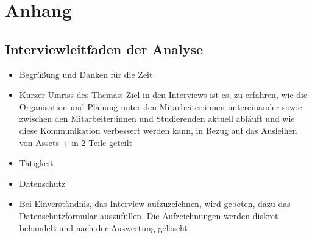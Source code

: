 \renewcommand{\thesection}{\Alph{section}}
\chapter{Anhang}

\section{Interviewleitfaden der Analyse}
\label{appendix:interview}

\begin{itemize}
    \item Begrüßung und Danken für die Zeit
    \item Kurzer Umriss des Themas: Ziel in den Interviews ist es, zu erfahren, wie die Organisation
          und Planung unter den Mitarbeiter:innen untereinander sowie zwischen den Mitarbeiter:innen und
          Studierenden aktuell abläuft und wie diese Kommunikation verbessert werden kann, in Bezug auf
          das Ausleihen von Assets + in 2 Teile geteilt
    \item Tätigkeit
    \item Datenschutz
    \item Bei Einverständnis, das Interview aufzuzeichnen, wird gebeten, dazu das
          Datenschutzformular auszufüllen. Die Aufzeichnungen werden diskret behandelt und nach der
          Auswertung gelöscht
\end{itemize}

